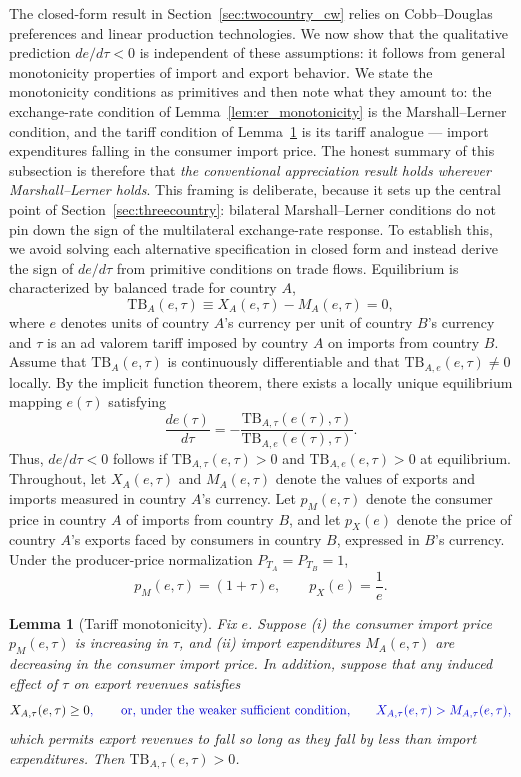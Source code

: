\documentclass[11pt]{article}
\theoremstyle{plain}
\newtheorem{lemma}{Lemma}
\theoremstyle{remark}
\numberwithin{lemma}{section}
\numberwithin{proposition}{section}
\numberwithin{corollary}{section}
\newcommand{\rev}[1]{{\color{RevBlue}#1}}
\begin{document}
The closed-form result in \rev{Section~\ref{sec:twocountry_cw}} relies on Cobb--Douglas preferences and linear production technologies. We now show that the qualitative prediction $de/d\tau < 0$ is independent of these assumptions: it follows from general monotonicity properties of import and export behavior\rev{. We state the monotonicity conditions as primitives and then note what they amount to: the exchange-rate condition of Lemma~\ref{lem:er_monotonicity} is the Marshall--Lerner condition, and the tariff condition of Lemma~\ref{lem:tariff_monotonicity} is its tariff analogue --- import expenditures falling in the consumer import price. The honest summary of this subsection is therefore that \emph{the conventional appreciation result holds wherever Marshall--Lerner holds}. This framing is deliberate, because it sets up the central point of Section~\ref{sec:threecountry}: bilateral Marshall--Lerner conditions do not pin down the sign of the multilateral exchange-rate response.} To establish this, we avoid solving each alternative specification in closed form and instead derive the sign of $de/d\tau$ from primitive conditions on trade flows. Equilibrium is characterized by balanced trade for country $A$,
\[
\mathrm{TB}_A(e,\tau) \equiv X_A(e,\tau) - M_A(e,\tau) = 0,
\]
where $e$ denotes units of country $A$'s currency per unit of country $B$'s currency and $\tau$ is an ad valorem tariff imposed by country $A$ on imports from country $B$. Assume that $\mathrm{TB}_A(e,\tau)$ is continuously differentiable and that $\mathrm{TB}_{A,e}(e,\tau) \neq 0$ locally. By the implicit function theorem, there exists a locally unique equilibrium mapping $e(\tau)$ satisfying
\[
\frac{de(\tau)}{d\tau} = -\frac{\mathrm{TB}_{A,\tau}(e(\tau),\tau)}{\mathrm{TB}_{A,e}(e(\tau),\tau)}.
\]
Thus, $de/d\tau < 0$ follows if $\mathrm{TB}_{A,\tau}(e,\tau) > 0$ and $\mathrm{TB}_{A,e}(e,\tau) > 0$ at equilibrium. Throughout, let $X_A(e,\tau)$ and $M_A(e,\tau)$ denote the values of exports and imports measured in country $A$'s currency. Let $p_M(e,\tau)$ denote the consumer price in country $A$ of imports from country $B$, and let $p_X(e)$ denote the price of country $A$'s exports faced by consumers in country $B$, expressed in $B$'s currency. Under the producer-price normalization $P_{T_A} = P_{T_B} = 1$,
\[
p_M(e,\tau) = (1+\tau)e, \qquad p_X(e) = \frac{1}{e}.
\]

\begin{lemma}[Tariff monotonicity]\label{lem:tariff_monotonicity}
Fix $e$. Suppose (i) the consumer import price $p_M(e,\tau)$ is increasing in $\tau$, and (ii) import expenditures $M_A(e,\tau)$ are decreasing in the consumer import price. In addition, suppose that any induced effect of $\tau$ on export revenues satisfies
\[
X_{A,\tau}(e,\tau) \ge 0\rev{, \qquad \text{or, under the weaker sufficient condition,} \qquad X_{A,\tau}(e,\tau) > M_{A,\tau}(e,\tau),}
\]
\rev{which permits export revenues to fall so long as they fall by less than import expenditures.} Then $\mathrm{TB}_{A,\tau}(e,\tau) > 0$.
\end{lemma}
\end{document}
